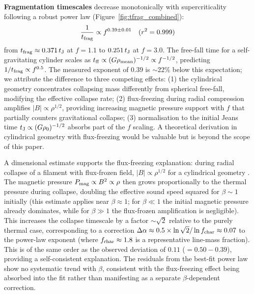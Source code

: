 \documentclass[twoside,twocolumn]{mnras}
\begin{document}
\textbf{Fragmentation timescales} decrease monotonically with supercriticality following
a robust power law (Figure~\ref{fig:tfrag_combined}):
\begin{equation}
\frac{1}{t_{\rm frag}} \propto f^{0.39 \pm 0.01} \quad (r^2 = 0.999)
\label{eq:powerlaw}
\end{equation}
from $t_{\rm frag} \approx 0.371\,t_{\rm J}$ at $f = 1.1$ to $0.251\,t_{\rm J}$ at
$f = 3.0$. The free-fall time for a self-gravitating cylinder scales as
$t_{\rm ff} \propto (G\rho_{\rm mean})^{-1/2} \propto f^{-1/2}$, predicting
$1/t_{\rm frag} \propto f^{0.5}$. The measured exponent of $0.39$ is $\sim$22\% below
this expectation; we attribute the difference to three competing effects: (1) the
cylindrical geometry concentrates collapsing mass differently from spherical free-fall,
modifying the effective collapse rate; (2) flux-freezing during radial compression
amplifies $|B| \propto \rho^{1/2}$, providing increasing magnetic pressure support
with $f$ that partially counters gravitational collapse; (3) normalisation to the
initial Jeans time $t_{\rm J} \propto (G\rho_0)^{-1/2}$ absorbs part of the $f$
scaling. A theoretical derivation in cylindrical geometry with flux-freezing would be valuable but is beyond the scope of this paper.

A dimensional estimate supports the flux-freezing explanation: during radial collapse of a filament with flux-frozen field, $|B| \propto \rho^{1/2}$ for a cylindrical geometry \citep{Nakamura1993}. The magnetic pressure $P_{\rm mag} \propto B^2 \propto \rho$ then grows proportionally to the thermal pressure during collapse, doubling the effective sound speed squared for $\beta \sim 1$ initially (this estimate applies near $\beta \approx 1$; for $\beta \ll 1$ the initial magnetic pressure already dominates, while for $\beta \gg 1$ the flux-frozen amplification is negligible). This increases the collapse timescale by a factor $\sim\sqrt{2}$ relative to the purely thermal case, corresponding to a correction $\Delta\alpha \approx 0.5 \times \ln\sqrt{2}/\ln f_{\rm char} \approx 0.07$ to the power-law exponent (where $f_{\rm char} \approx 1.8$ is a representative line-mass fraction). This is of the same order as the observed deviation of $0.11$ ($= 0.50 - 0.39$), providing a self-consistent explanation. The residuals from the best-fit power law show no systematic trend with $\beta$, consistent with the flux-freezing effect being absorbed into the fit rather than manifesting as a separate $\beta$-dependent correction.
\end{document}
